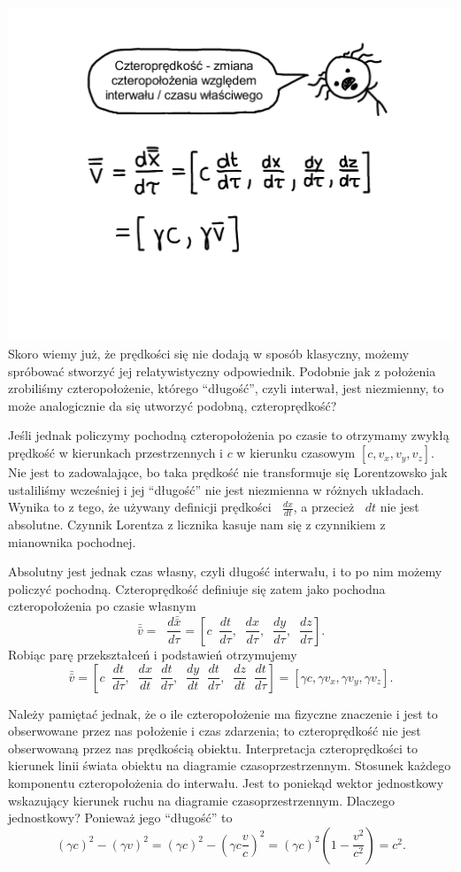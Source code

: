 \documentclass[10pt,twocolumn,fleqn,polish]{article}
\newcommand{\diff}{\mathop{}\!{d}}
\newcommand{\derivative}[2][]{\mathop{}\!\frac{{d}#1}{{d}#2}}
\newcommand{\fourvec}[1]{\bar{\bar{#1}}}
\begin{document}
\noindent\includegraphics[width=1\linewidth]{pages/STA-page35}
Skoro wiemy już, że prędkości się nie dodają w sposób klasyczny, możemy
spróbować stworzyć jej relatywistyczny odpowiednik.
Podobnie jak z położenia zrobiliśmy czteropołożenie, którego ``długość'', czyli
interwał, jest niezmienny, to może analogicznie da się utworzyć podobną, czteroprędkość?

Jeśli jednak policzymy pochodną czteropołożenia po czasie to otrzymamy zwykłą
prędkość w kierunkach przestrzennych i $c$ w kierunku czasowym $[c, v_x, v_y, v_z]$.
Nie jest to zadowalające, bo taka prędkość nie transformuje się Lorentzowsko
jak ustaliliśmy wcześniej i jej ``długość'' nie jest niezmienna w różnych układach.
Wynika to z tego, że używany definicji prędkości $\derivative[x]{t}$, a przecież
$\diff t$ nie jest absolutne. Czynnik Lorentza z licznika kasuje nam się z czynnikiem
z mianownika pochodnej.

Absolutny jest jednak czas własny, czyli długość interwału, i to po nim możemy
policzyć pochodną. Czteroprędkość definiuje się zatem jako pochodna czteropołożenia
po czasie własnym
\[
  \fourvec{v} = \derivative[\fourvec{x}]{\tau} 
    = \left[c \derivative[t]{\tau}, \derivative[x]{\tau}, \derivative[y]{\tau}, \derivative[z]{\tau} \right].
\]
Robiąc parę przekształceń i podstawień otrzymujemy
\[ \fourvec{v}
  = \left[
    c\derivative[t]\tau,
    \derivative[x]t\derivative[t]{\tau},
    \derivative[y]t\derivative[t]{\tau},
    \derivative[z]t\derivative[t]{\tau}
    \right]
  = [\gamma c, \gamma v_x, \gamma v_y, \gamma v_z]. 
\]

Należy pamiętać jednak, że o ile czteropołożenie ma fizyczne znaczenie i
jest to obserwowane przez nas położenie i czas zdarzenia; to czteroprędkość
nie jest obserwowaną przez nas prędkością obiektu. Interpretacja czteroprędkości
to kierunek linii świata obiektu na diagramie czasoprzestrzennym. Stosunek
każdego komponentu czteropołożenia do interwału.
Jest to poniekąd wektor jednostkowy wskazujący kierunek ruchu na diagramie
czasoprzestrzennym. Dlaczego jednostkowy? Ponieważ jego ``długość'' to
\[
  (\gamma c)^2 - (\gamma v)^2 = (\gamma c)^2 - \left(\gamma c \frac{v}{c}\right)^2
   = (\gamma c)^2 \left(1 - \frac{v^2}{c^2}\right) = c^2.
\]
\end{document}
